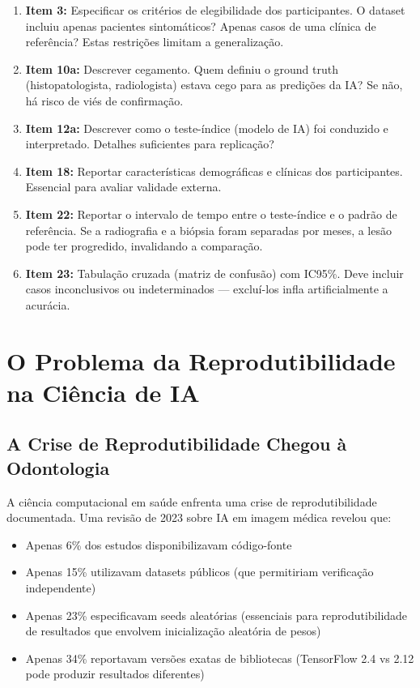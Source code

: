 \begin{enumerate}
    \item \textbf{Item 3:} Especificar os critérios de elegibilidade dos participantes. O dataset incluiu apenas pacientes sintomáticos? Apenas casos de uma clínica de referência? Estas restrições limitam a generalização.
    \item \textbf{Item 10a:} Descrever cegamento. Quem definiu o ground truth (histopatologista, radiologista) estava cego para as predições da IA? Se não, há risco de viés de confirmação.
    \item \textbf{Item 12a:} Descrever como o teste-índice (modelo de IA) foi conduzido e interpretado. Detalhes suficientes para replicação?
    \item \textbf{Item 18:} Reportar características demográficas e clínicas dos participantes. Essencial para avaliar validade externa.
    \item \textbf{Item 22:} Reportar o intervalo de tempo entre o teste-índice e o padrão de referência. Se a radiografia e a biópsia foram separadas por meses, a lesão pode ter progredido, invalidando a comparação.
    \item \textbf{Item 23:} Tabulação cruzada (matriz de confusão) com IC95\%. Deve incluir casos inconclusivos ou indeterminados — excluí-los infla artificialmente a acurácia.
\end{enumerate}

\section{O Problema da Reprodutibilidade na Ciência de IA}

\subsection{A Crise de Reprodutibilidade Chegou à Odontologia}

A ciência computacional em saúde enfrenta uma crise de reprodutibilidade documentada. Uma revisão de 2023 sobre IA em imagem médica revelou que:

\begin{itemize}
    \item Apenas 6\% dos estudos disponibilizavam código-fonte
    \item Apenas 15\% utilizavam datasets públicos (que permitiriam verificação independente)
    \item Apenas 23\% especificavam seeds aleatórias (essenciais para reprodutibilidade de resultados que envolvem inicialização aleatória de pesos)
    \item Apenas 34\% reportavam versões exatas de bibliotecas (TensorFlow 2.4 vs 2.12 pode produzir resultados diferentes)
\end{itemize}

